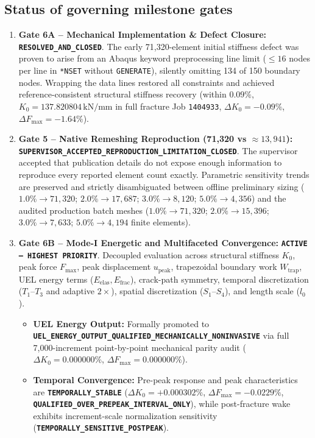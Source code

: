 \subsection{Status of governing milestone gates}
\begin{enumerate}[label=\textbf{\arabic*.},leftmargin=6mm,itemsep=2pt]
  \item \textbf{Gate 6A -- Mechanical Implementation \& Defect Closure:} \textbf{\texttt{RESOLVED\_AND\_CLOSED}}. The early 71,320-element initial stiffness defect was proven to arise from an Abaqus keyword preprocessing line limit ($\le 16$ nodes per line in \texttt{*NSET} without \texttt{GENERATE}), silently omitting 134 of 150 boundary nodes. Wrapping the data lines restored all constraints and achieved reference-consistent structural stiffness recovery (within $0.09\%$, $K_0 = 137.820804\,\mathrm{kN/mm}$ in full fracture Job \texttt{1404933}, $\Delta K_0 = -0.09\%$, $\Delta F_{\max} = -1.64\%$).
  \item \textbf{Gate 5 -- Native Remeshing Reproduction (71,320 vs $\approx 13{,}941$):} \textbf{\nolinkurl{SUPERVISOR_ACCEPTED_REPRODUCTION_LIMITATION_CLOSED}}. The supervisor accepted that publication details do not expose enough information to reproduce every reported element count exactly. Parametric sensitivity trends are preserved and strictly disambiguated between offline preliminary sizing ($1.0\% \to 71{,}320$; $2.0\% \to 17{,}687$; $3.0\% \to 8{,}120$; $5.0\% \to 4{,}356$) and the audited production batch meshes ($1.0\% \to 71{,}320$; $2.0\% \to 15{,}396$; $3.0\% \to 7{,}633$; $5.0\% \to 4{,}194$ finite elements).
  \item \textbf{Gate 6B -- Mode-I Energetic and Multifaceted Convergence:} \textbf{\texttt{ACTIVE -- HIGHEST PRIORITY}}. Decoupled evaluation across structural stiffness $K_0$, peak force $F_{\max}$, peak displacement $u_{\mathrm{peak}}$, trapezoidal boundary work $W_{\mathrm{trap}}$, UEL energy terms ($E_{\mathrm{elas}}, E_{\mathrm{frac}}$), crack-path symmetry, temporal discretization ($T_1$--$T_3$ and adaptive $2\times$), spatial discretization ($S_1$--$S_4$), and length scale ($l_0$).
  \begin{itemize}[leftmargin=4mm,itemsep=1pt]
    \item \textbf{UEL Energy Output:} Formally promoted to \textbf{\texttt{UEL\_ENERGY\_OUTPUT\_QUALIFIED\_MECHANICALLY\_NONINVASIVE}} via full 7,000-increment point-by-point mechanical parity audit ($\Delta K_0 = 0.000000\%$, $\Delta F_{\max} = 0.000000\%$).
    \item \textbf{Temporal Convergence:} Pre-peak response and peak characteristics are \textbf{\texttt{TEMPORALLY\_STABLE}} ($\Delta K_0 = +0.000302\%$, $\Delta F_{\max} = -0.0229\%$, \textbf{\texttt{QUALIFIED\_OVER\_PREPEAK\_INTERVAL\_ONLY}}), while post-fracture wake exhibits increment-scale normalization sensitivity (\textbf{\texttt{TEMPORALLY\_SENSITIVE\_POSTPEAK}}).

\end{itemize}
\end{enumerate}
